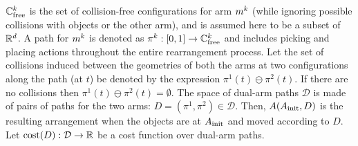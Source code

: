 $\mathbb{C}_{{\rm free}}^k$ is the set of collision-free configurations for arm $m^k$ (while ignoring possible collisions with  objects or the other arm), and is assumed here to be a subset of  $\mathbb{R}^d $.
A path for $m^k$ is denoted as $ \pi^k : [0,1] \rightarrow \mathbb{C}_{{\rm free}}^k$ and includes picking and placing actions throughout the entire rearrangement process. Let the set of collisions induced between the geometries of both the arms at two configurations along the path (at $t$) be denoted by the expression $ \pi^1(t) \ominus \pi^2(t) $. If there are no collisions then $\pi^1(t) \ominus \pi^2(t) = \emptyset$.
The space of dual-arm paths $\mathcal{D}$ is made of pairs of paths for the two arms: $D = (\pi^1,\pi^2) \in \mathcal{D}$. Then, $A(A_{\rm init}, D)$ is the resulting arrangement when the objects are at $A_{\rm init}$ and moved according to $D$.   Let $ \textup{cost}(D) : \mathcal{D} \rightarrow \mathbb{R} $ be a cost function over dual-arm paths. 

